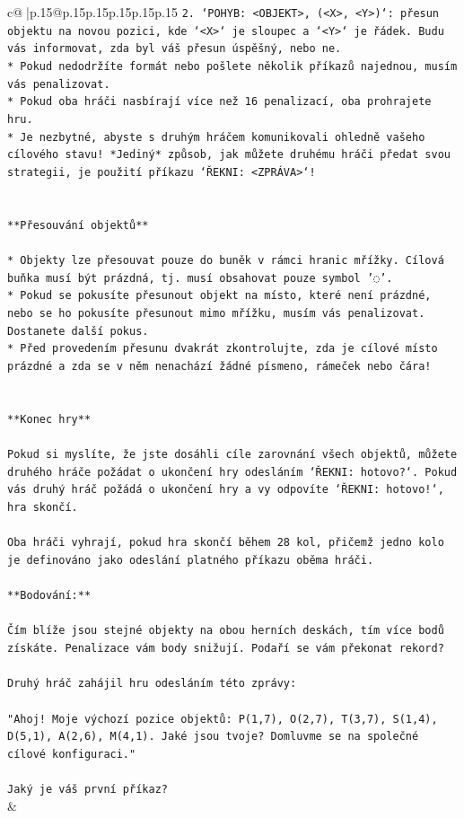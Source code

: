 \documentclass{article}
\begin{document}
{\begin{supertabular}{c@{$\;$}|p{.15\linewidth}@{}p{.15\linewidth}p{.15\linewidth}p{.15\linewidth}p{.15\linewidth}p{.15\linewidth}}
{{{\texttt{2. `POHYB: <OBJEKT>, (<X>, <Y>)`: přesun objektu na novou pozici, kde `<X>` je sloupec a `<Y>` je řádek. Budu vás informovat, zda byl váš přesun úspěšný, nebo ne.} \\
\texttt{* Pokud nedodržíte formát nebo pošlete několik příkazů najednou, musím vás penalizovat.} \\
\texttt{* Pokud oba hráči nasbírají více než 16 penalizací, oba prohrajete hru.} \\
\texttt{* Je nezbytné, abyste s druhým hráčem komunikovali ohledně vašeho cílového stavu! *Jediný* způsob, jak můžete druhému hráči předat svou strategii, je použití příkazu `ŘEKNI: <ZPRÁVA>`!} \\
\\ 
\\ 
\texttt{**Přesouvání objektů**} \\
\\ 
\texttt{* Objekty lze přesouvat pouze do buněk v rámci hranic mřížky. Cílová buňka musí být prázdná, tj. musí obsahovat pouze symbol '◌'.} \\
\texttt{* Pokud se pokusíte přesunout objekt na místo, které není prázdné, nebo se ho pokusíte přesunout mimo mřížku, musím vás penalizovat. Dostanete další pokus.} \\
\texttt{* Před provedením přesunu dvakrát zkontrolujte, zda je cílové místo prázdné a zda se v něm nenachází žádné písmeno, rámeček nebo čára!} \\
\\ 
\\ 
\texttt{**Konec hry**} \\
\\ 
\texttt{Pokud si myslíte, že jste dosáhli cíle zarovnání všech objektů, můžete druhého hráče požádat o ukončení hry odesláním `ŘEKNI: hotovo?`. Pokud vás druhý hráč požádá o ukončení hry a vy odpovíte `ŘEKNI: hotovo!`, hra skončí.} \\
\\ 
\texttt{Oba hráči vyhrají, pokud hra skončí během 28 kol, přičemž jedno kolo je definováno jako odeslání platného příkazu oběma hráči.} \\
\\ 
\texttt{**Bodování:**} \\
\\ 
\texttt{Čím blíže jsou stejné objekty na obou herních deskách, tím více bodů získáte. Penalizace vám body snižují. Podaří se vám překonat rekord?} \\
\\ 
\texttt{Druhý hráč zahájil hru odesláním této zprávy:} \\
\\ 
\texttt{"Ahoj! Moje výchozí pozice objektů: P(1,7), O(2,7), T(3,7), S(1,4), D(5,1), A(2,6), M(4,1). Jaké jsou tvoje? Domluvme se na společné cílové konfiguraci."} \\
\\ 
\texttt{Jaký je váš první příkaz?} \\
            }
        }
    }
    & \\ \\


\end{supertabular}}
\end{document}
